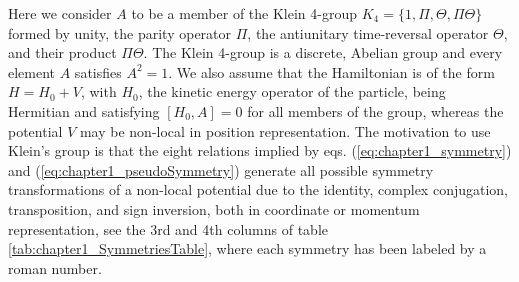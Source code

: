 Here we consider
$A$ to be a member of the
Klein 4-group $K_4=\{1,\Pi, \Theta, \Pi\Theta\}$ formed by unity, the parity operator $\Pi$, the antiunitary time-reversal operator $\Theta$, and their product
$\Pi\Theta$. The Klein 4-group is a discrete, Abelian group and every element $A$ satisfies $A^2 = 1$. We also assume that the  Hamiltonian is  of the form $H=H_0+V$, with $H_0$, the kinetic energy operator of the particle,
being Hermitian and
satisfying $[H_0,A]=0$ for all members of the group, whereas the potential $V$ may be non-local in position representation.
The  motivation to use Klein's group is that the eight relations implied by eqs. (\ref{eq:chapter1_symmetry}) and (\ref{eq:chapter1_pseudoSymmetry}) generate all
possible symmetry transformations of a non-local potential due to the identity, complex conjugation, transposition, and sign inversion,
both in coordinate or momentum representation, see the 3rd and 4th columns of table \ref{tab:chapter1_SymmetriesTable}, where each symmetry has been labeled by a roman number.

